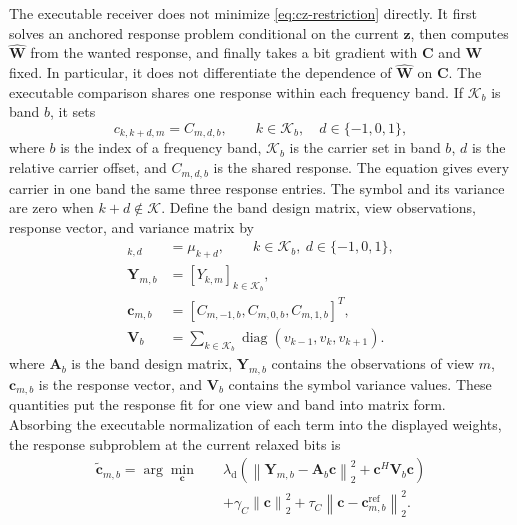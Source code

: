 \documentclass[conference]{IEEEtran}
\newcommand{\Kset}{\mathcal{K}}
\newcommand{\norm}[1]{\left\lVert #1\right\rVert}
\begin{document}
The executable receiver does not minimize \eqref{eq:cz-restriction} directly.
It first solves an anchored response problem conditional on the current
\(\mathbf z\), then computes \(\widehat{\mathbf W}\) from the wanted response,
and finally takes a bit gradient with \(\mathbf C\) and \(\mathbf W\) fixed.
In particular, it does not differentiate the dependence of
\(\widehat{\mathbf W}\) on \(\mathbf C\).  The executable comparison shares
one response within each frequency band.  If \(\Kset_b\) is band \(b\), it
sets
\begin{equation}
  c_{k,k+d,m}=C_{m,d,b},
  \qquad
  k\in\Kset_b,\quad d\in\{-1,0,1\},
  \label{eq:band-tied-response}
\end{equation}
where \(b\) is the index of a frequency band, \(\Kset_b\) is the carrier set in band
\(b\), \(d\) is the relative carrier offset, and \(C_{m,d,b}\) is the
shared response.  The equation gives every carrier in one band the same
three response entries.
The symbol and its variance are zero when \(k+d\notin\Kset\).  Define the
band design matrix, view observations, response vector, and variance matrix by
\begin{align}
  [\mathbf A_b]_{k,d}
  &=\mu_{k+d},
  \qquad k\in\Kset_b,\ d\in\{-1,0,1\},
  \label{eq:band-design}\\
  \mathbf Y_{m,b}
  &=[Y_{k,m}]_{k\in\Kset_b},
  \label{eq:band-observations}\\
  \mathbf c_{m,b}
  &=[C_{m,-1,b},C_{m,0,b},C_{m,1,b}]^T,
  \label{eq:band-vectors}\\
  \mathbf V_b
  &=\sum_{k\in\Kset_b}
  \operatorname{diag}(v_{k-1},v_k,v_{k+1}).
  \label{eq:band-variance}
\end{align}
where \(\mathbf A_b\) is the band design matrix, \(\mathbf Y_{m,b}\) contains
the observations of view \(m\), \(\mathbf c_{m,b}\) is the response vector,
and \(\mathbf V_b\) contains the symbol variance values.  These quantities put the
response fit for one view and band into matrix form.
Absorbing the executable normalization of each term into the displayed weights,
the response subproblem at the current relaxed bits is
\begin{equation}
  \begin{aligned}
  \widetilde{\mathbf c}_{m,b}
  =\arg\min_{\mathbf c}\quad
  &\lambda_{\mathrm d}
  \left(
  \norm{\mathbf Y_{m,b}-\mathbf A_b\mathbf c}_2^2
  +\mathbf c^H\mathbf V_b\mathbf c
  \right)\\
  &+\gamma_C\norm{\mathbf c}_2^2
  +\tau_C\norm{\mathbf c-\mathbf c_{m,b}^{\mathrm{ref}}}_2^2 .
  \end{aligned}
  \label{eq:response-subproblem}
\end{equation}
\end{document}
